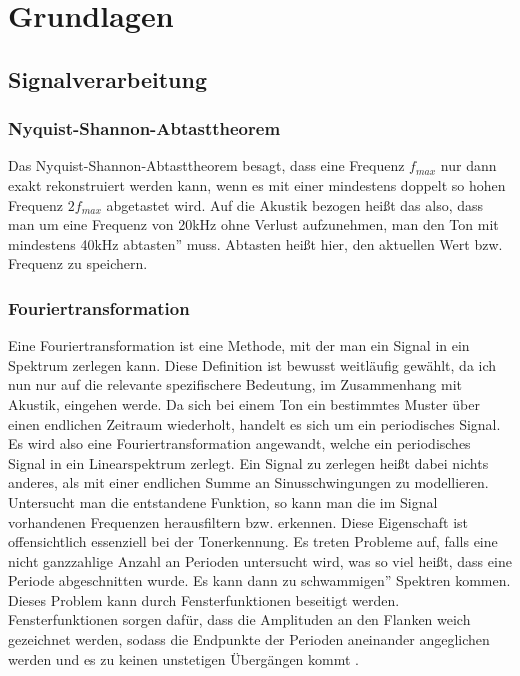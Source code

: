 \chapter{Grundlagen}
\section{Signalverarbeitung}
\subsection*{Nyquist-Shannon-Abtasttheorem}
\label{sec:Abtast}
Das Nyquist-Shannon-Abtasttheorem besagt, dass eine Frequenz $f_{max}$ nur dann exakt rekonstruiert werden kann, wenn es mit einer mindestens doppelt so hohen Frequenz $2f_{max}$ abgetastet wird. Auf die Akustik bezogen heißt das also, dass man um eine Frequenz von 20kHz ohne Verlust aufzunehmen, 
man den Ton mit mindestens 40kHz \glqq abtasten'' muss. Abtasten heißt hier, den aktuellen Wert bzw. Frequenz zu speichern. 

\subsection*{Fouriertransformation}
\label{sec:Fouriertransformation}
Eine Fouriertransformation ist eine Methode, mit der man ein Signal in ein Spektrum zerlegen kann. Diese Definition ist bewusst weitläufig gewählt, da ich nun nur auf die relevante spezifischere Bedeutung, im Zusammenhang mit Akustik, eingehen werde.
Da sich bei einem Ton ein bestimmtes Muster über einen endlichen Zeitraum wiederholt, handelt es sich um ein periodisches Signal. Es wird also eine Fouriertransformation angewandt, welche ein
periodisches Signal in ein Linearspektrum zerlegt. Ein Signal zu zerlegen heißt dabei nichts anderes, als mit einer endlichen Summe an Sinusschwingungen zu modellieren. Untersucht man die entstandene Funktion, so kann man die im Signal vorhandenen Frequenzen 
herausfiltern bzw. erkennen. Diese Eigenschaft ist offensichtlich essenziell bei der Tonerkennung. Es treten Probleme auf, falls eine nicht ganzzahlige Anzahl an Perioden untersucht wird, was so viel heißt, dass eine Periode abgeschnitten wurde. Es kann dann zu \glqq schwammigen'' Spektren kommen.
Dieses Problem kann durch Fensterfunktionen beseitigt werden. Fensterfunktionen sorgen dafür, dass die Amplituden an den Flanken weich gezeichnet werden, sodass die Endpunkte der Perioden aneinander angeglichen werden und es zu keinen unstetigen Übergängen kommt \cite{Butz2006}.

